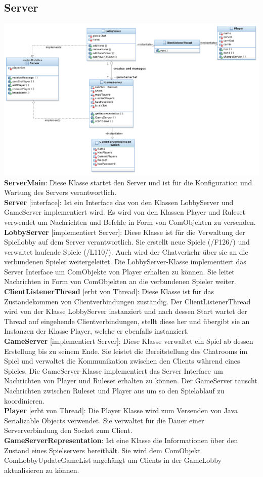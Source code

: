 \documentclass{article}
\begin{document}
\subsection{Server}
\includegraphics[width=\textwidth]{Server}
\textbf{ServerMain}: Diese Klasse startet den Server und ist für die Konfiguration und Wartung des Servers verantwortlich. \\
		\textbf{Server} [interface]: Ist ein Interface das von den Klassen LobbyServer und GameServer implementiert wird. Es wird von den Klassen Player und Ruleset verwendet um Nachrichten und Befehle in Form von ComObjekten zu versenden. \\
		\textbf{LobbyServer} [implementiert Server]: Diese Klasse ist für die Verwaltung der Spiellobby auf dem Server verantwortlich. Sie erstellt neue Spiele (/F126/) und verwaltet laufende Spiele (/L110/). Auch wird der Chatverkehr über sie an die verbundenen Spieler weitergeleitet. Die LobbyServer-Klasse implementiert das Server Interface um ComObjekte von Player erhalten zu können. Sie leitet Nachrichten in Form von ComObjekten an die verbundenen Spieler weiter. \\
		\textbf{ClientListenerThread} [erbt von Thread]: Diese Klasse ist für das Zustandekommen von Clientverbindungen zuständig. Der ClientListenerThread wird von der Klasse LobbyServer instanziert und nach dessen Start wartet der Thread auf eingehende Clientverbindungen, stellt diese her und übergibt sie an Instanzen der Klasse Player, welche er ebenfalls instanziert. \\
		\textbf{GameServer} [implementiert Server]: Diese Klasse verwaltet ein Spiel ab dessen Erstellung bis zu seinem Ende. Sie leistet die Bereitstellung des Chatrooms im Spiel und verwaltet die Kommunikation zwischen den Clients während eines Spieles. Die GameServer-Klasse implementiert das Server Interface um Nachrichten von Player und Ruleset erhalten zu können. Der GameServer tauscht Nachrichten zwischen Ruleset und Player aus um so den Spielablauf zu koordinieren.\\
		\textbf{Player} [erbt von Thread]: Die Player Klasse wird zum Versenden von Java Serializable Objects verwendet. Sie verwaltet für die Dauer einer Serververbindung den Socket zum Client. \\
		\textbf{GameServerRepresentation}: Ist eine Klasse die Informationen über den Zustand eines Spielservers bereithält. Sie wird dem ComObjekt ComLobbyUpdateGameList angehängt um Clients in der GameLobby aktualisieren zu können.
\end{document}
